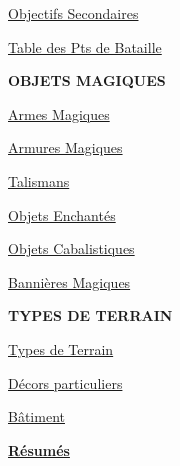 \begin{framed}
\begin{multicols}{3}
\vspace*{5pt}
{\setlength\parskip{0pt}
\hyperlink{secondaryobjectives}{Objectifs Secondaires}\hfill\pageref{secondary_objectives}

\hyperlink{victorypointstable}{Table des Pts de Bataille}\hfill\pageref{victory_points_table}}

\vspace*{\fill}
\columnbreak

\begin{center}\textbf{OBJETS MAGIQUES}\end{center}

\vspace*{5pt}
{\setlength\parskip{0pt}
\hyperlink{magicalweapons}{Armes Magiques}\hfill\pageref{magical_weapons}

\hyperlink{magicalarmour}{Armures Magiques}\hfill\pageref{magical_armour}

\hyperlink{talismans}{Talismans}\hfill\pageref{talismans}

\hyperlink{enchanteditems}{Objets Enchantés}\hfill\pageref{enchanted_items}

\hyperlink{arcaneitems}{Objets Cabalistiques}\hfill\pageref{arcane_items}

\hyperlink{magicalstandards}{Bannières Magiques}\hfill\pageref{magical_standards}}

\vspace*{5pt}
\begin{center}\textbf{TYPES DE TERRAIN}\end{center}

\vspace*{5pt}
{\setlength\parskip{0pt}
\hyperlink{terraintypes}{Types de Terrain}\hfill\pageref{terrain_types}

\hyperlink{terrainfeatures}{Décors particuliers}\hfill\pageref{terrain_features}

\hyperlink{buildings}{Bâtiment}\hfill\pageref{buildings}}

\vspace*{\fill}

\begin{center}\hyperlink{summaries}{\textbf{Résumés}}\end{center}

\end{multicols}
\setlength\columnseprule{0pt}
\vspace*{-10pt}
\end{framed}

\vspace*{20pt}
\begin{center}\Hugefontsize{}\end{center}
\vspace*{10pt}

